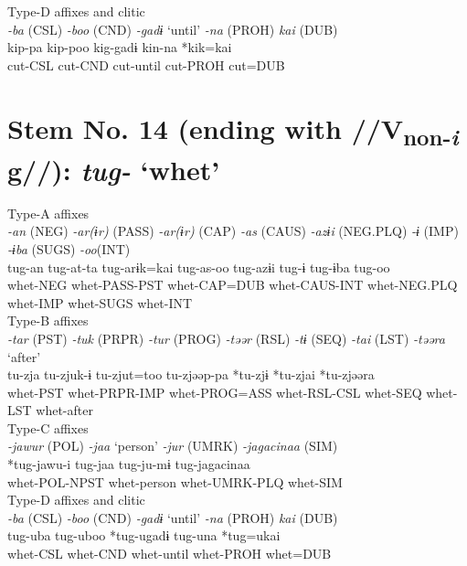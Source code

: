 \ex Type-D affixes and clitic\\
\glll \textit{-ba} (CSL)  \textit{-boo} (CND)  \textit{-gadɨ} ‘until’  \textit{-na} (PROH)  \textit{kai} (DUB)\\
kip-pa  kip-poo  kig-gadɨ  kin-na  *kik=kai\\
cut-CSL  cut-CND  cut-until  cut-PROH  cut=DUB\\
\z

\section{Stem No. 14 (ending with //V\textsubscript{non-}\textit{\textsubscript{i}} g//): \textit{tug-} ‘whet’}

\ea Type-A affixes\\
\glll \textit{-an} (NEG)  \textit{-ar(ɨr)} (PASS)  \textit{-ar(ɨr)} (CAP)  \textit{-as} (CAUS)  \textit{-azɨi} (NEG.PLQ)  \textit{-ɨ} (IMP)  \textit{-ɨba} (SUGS)  \textit{-oo}(INT)\\
tug-an  tug-at-ta  tug-arɨk=kai  tug-as-oo  tug-azɨi  tug-ɨ  tug-ɨba  tug-oo\\
whet-NEG  whet-PASS-PST  whet-CAP=DUB  whet-CAUS-INT  whet-NEG.PLQ  whet-IMP  whet-SUGS  whet-INT\\


\ex Type-B affixes\\
\glll \textit{-tar} (PST)  \textit{-tuk} (PRPR)  \textit{-tur} (PROG)  \textit{-təər} (RSL)  \textit{-tɨ} (SEQ)  \textit{-tai} (LST)  \textit{-təəra} ‘after’\\
tu-zja  tu-zjuk-ɨ  tu-zjut=too  tu-zjəəp-pa  *tu-zjɨ  *tu-zjai  *tu-zjəəra\\
whet-PST  whet-PRPR-IMP  whet-PROG=ASS  whet-RSL-CSL  whet-SEQ  whet-LST  whet-after\\


\ex Type-C affixes\\
\glll \textit{-jawur} (POL)  \textit{-jaa} ‘person’  \textit{-jur} (UMRK)  \textit{-jagacinaa} (SIM)\\
*tug-jawu-i  tug-jaa  tug-ju-mɨ  tug-jagacinaa\\
whet-POL-NPST  whet-person  whet-UMRK-PLQ  whet-SIM\\


\ex Type-D affixes and clitic\\
\glll \textit{-ba} (CSL)  \textit{-boo} (CND)  \textit{-gadɨ} ‘until’  \textit{-na} (PROH)  \textit{kai} (DUB)\\
tug-uba  tug-uboo  *tug-ugadɨ  tug-una  *tug=ukai\\
whet-CSL  whet-CND  whet-until  whet-PROH  whet=DUB\\
\z

